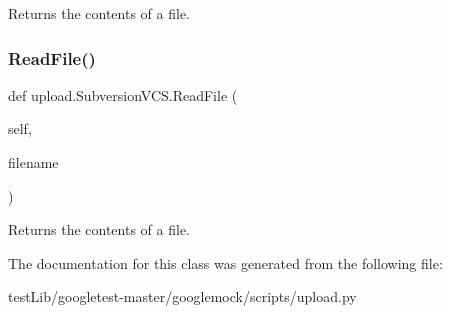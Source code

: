 \begin{DoxyVerb}Returns the contents of a file.\end{DoxyVerb}
 \mbox{\label{classupload_1_1SubversionVCS_a340d269b74386ac863636f6b0683d9f4}} 
\subsubsection{\texorpdfstring{Read\+File()}{ReadFile()}\hspace{0.1cm}{\footnotesize\ttfamily [2/2]}}
{\footnotesize\ttfamily def upload.\+Subversion\+V\+C\+S.\+Read\+File (\begin{DoxyParamCaption}\item[{}]{self,  }\item[{}]{filename }\end{DoxyParamCaption})}

\begin{DoxyVerb}Returns the contents of a file.\end{DoxyVerb}
 

The documentation for this class was generated from the following file\+:\begin{DoxyCompactItemize}
\item 
test\+Lib/googletest-\/master/googlemock/scripts/upload.\+py\end{DoxyCompactItemize}
